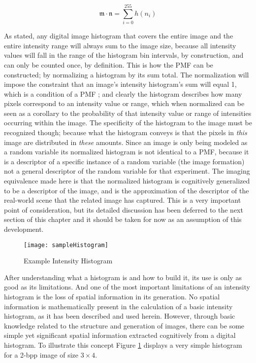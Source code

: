 \begin{equation}
\label{histSum}
	\mathfrak{m} \cdot \mathfrak{n} = \sum_{i=0}^{255}{h(n_{i})}
\end{equation}

As stated, any digital image histogram that covers the entire image and the entire intensity range will always sum to the image size, because all intensity values will fall in the range of the histogram bin intervals, by construction, and can only be counted once, by definition. This is how the PMF can be constructed; by normalizing a histogram by its sum total. The normalization will impose the constraint that an image's intensity histogram's sum will equal 1, which is a condition of a PMF \cite{Papoulis2002}; and clearly the histogram describes how many pixels correspond to an intensity value or range, which when normalized can be seen as a corollary to the probability of that intensity value or range of intensities occurring within the image. The specificity of the histogram to the image must be recognized though; because what the histogram conveys is that the pixels in \textit{this} image are distributed in \textit{these} amounts. Since an image is only being modeled as a random variable its normalized histogram is not identical to a PMF, because it is a descriptor of a specific instance of a random variable (the image formation) not a general descriptor of the random variable for that experiment. The imaging equivalence made here is that the normalized histogram is cognitively generalized to be a descriptor of the image, and is the approximation of the descriptor of the real-world scene that the related image has captured. This is a very important point of consideration, but its detailed discussion has been deferred to the next section of this chapter and it should be taken for now as an assumption of this development.

\begin{figure}[h]
\centering
\texttt{[image: sampleHistogram]}
\caption{Example Intensity Histogram}
\label{sampleHist}
\end{figure}

After understanding what a histogram is and how to build it, its use is only as good as its limitations. And one of the most important limitations of an intensity histogram is the loss of spatial information in its generation. No spatial information is mathematically present in the calculation of a basic intensity histogram, as it has been described and used herein. However, through basic knowledge related to the structure and generation of images, there can be some simple yet significant spatial information extracted cognitively from a digital histogram. To illustrate this concept Figure \ref{sampleHist} displays a very simple histogram for a 2-bpp image of size $3\times4$.

